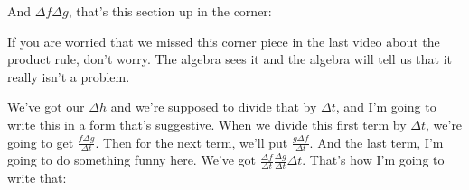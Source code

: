 \documentclass[pdftex, brazil, 12pt, twoside]{article}
\begin{document}
\begin{figure}[H]
  \begin{center}
  \end{center}
\end{figure}

And $\Delta f \Delta g$, that's this section up in the corner:

\begin{figure}[H]
  \begin{center}
  \end{center}
\end{figure}

If you are worried that we missed this corner
piece in the last video about the product rule, don't worry.
The algebra sees it and the algebra will tell us
that it really isn't a problem.

We've got our $\Delta h$ and we're supposed to divide that
by $\Delta t$, and I'm going to write this
in a form that's suggestive.
When we divide this first term by $\Delta t$,
we're going to get $\displaystyle \frac{f\Delta g}{\Delta t}$.
Then for the next term, we'll put $\displaystyle \frac{g\Delta f}{\Delta t}$.
And the last term, I'm going to do something funny here.
We've got $\displaystyle \frac{\Delta f}{\Delta t}\frac{\Delta g}{\Delta t}\Delta t$.
That's how I'm going to write that:
\end{document}

